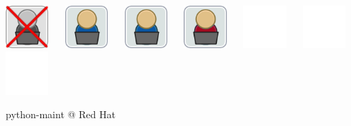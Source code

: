 \documentclass[1610,20pt]{beamer}
\newcommand\sk{\par\bigskip\bigskip\par}
\begin{document}
\begin{center}
\begin{frame}[fragile]
    \includegraphics[width=0.12\textwidth]{Join_OSDeveloper-x} ~~
    \includegraphics[width=0.12\textwidth]{Join_OSDeveloper} ~~
    \includegraphics[width=0.12\textwidth]{Join_OSDeveloper} ~~ 
    \includegraphics[width=0.12\textwidth]{Join_OSDeveloper-me} ~~
    \includegraphics[width=0.12\textwidth]{Join_OSDeveloper-no} ~~
    \includegraphics[width=0.12\textwidth]{Join_OSDeveloper-no} ~~
    \includegraphics[width=0.12\textwidth]{Join_OSDeveloper-no}
\end{frame}

\begin{frame}[fragile]
    python-maint @ Red Hat
    \sk


\end{frame}
\end{center}
\end{document}
